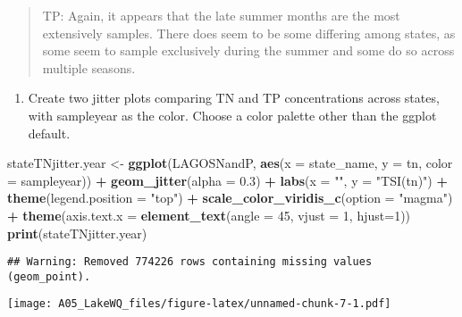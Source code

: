 \documentclass[]{article}
\newenvironment{Shaded}{\begin{snugshade}}{\end{snugshade}}
\newcommand{\DataTypeTok}[1]{\textcolor[rgb]{0.13,0.29,0.53}{#1}}
\newcommand{\DecValTok}[1]{\textcolor[rgb]{0.00,0.00,0.81}{#1}}
\newcommand{\FloatTok}[1]{\textcolor[rgb]{0.00,0.00,0.81}{#1}}
\newcommand{\KeywordTok}[1]{\textcolor[rgb]{0.13,0.29,0.53}{\textbf{#1}}}
\newcommand{\NormalTok}[1]{#1}
\newcommand{\OperatorTok}[1]{\textcolor[rgb]{0.81,0.36,0.00}{\textbf{#1}}}
\newcommand{\StringTok}[1]{\textcolor[rgb]{0.31,0.60,0.02}{#1}}
\providecommand{\tightlist}{%
  \setlength{\itemsep}{0pt}\setlength{\parskip}{0pt}}
\begin{document}
\begin{quote}
TP: Again, it appears that the late summer months are the most
extensively samples. There does seem to be some differing among states,
as some seem to sample exclusively during the summer and some do so
across multiple seasons.
\end{quote}

\begin{enumerate}
\def\labelenumi{\arabic{enumi}.}
\setcounter{enumi}{10}
\tightlist
\item
  Create two jitter plots comparing TN and TP concentrations across
  states, with sampleyear as the color. Choose a color palette other
  than the ggplot default.
\end{enumerate}

\begin{Shaded}
\begin{Highlighting}[]
\NormalTok{stateTNjitter.year <-}\StringTok{ }\KeywordTok{ggplot}\NormalTok{(LAGOSNandP, }\KeywordTok{aes}\NormalTok{(}\DataTypeTok{x =}\NormalTok{ state_name, }\DataTypeTok{y =}\NormalTok{ tn, }\DataTypeTok{color =}\NormalTok{ sampleyear)) }\OperatorTok{+}
\StringTok{  }\KeywordTok{geom_jitter}\NormalTok{(}\DataTypeTok{alpha =} \FloatTok{0.3}\NormalTok{) }\OperatorTok{+}
\StringTok{  }\KeywordTok{labs}\NormalTok{(}\DataTypeTok{x =} \StringTok{""}\NormalTok{, }\DataTypeTok{y =} \StringTok{"TSI(tn)"}\NormalTok{) }\OperatorTok{+}
\StringTok{  }\KeywordTok{theme}\NormalTok{(}\DataTypeTok{legend.position =} \StringTok{"top"}\NormalTok{) }\OperatorTok{+}
\StringTok{  }\KeywordTok{scale_color_viridis_c}\NormalTok{(}\DataTypeTok{option =} \StringTok{"magma"}\NormalTok{) }\OperatorTok{+}
\StringTok{  }\KeywordTok{theme}\NormalTok{(}\DataTypeTok{axis.text.x =} \KeywordTok{element_text}\NormalTok{(}\DataTypeTok{angle =} \DecValTok{45}\NormalTok{, }\DataTypeTok{vjust =} \DecValTok{1}\NormalTok{, }\DataTypeTok{hjust=}\DecValTok{1}\NormalTok{))}
\KeywordTok{print}\NormalTok{(stateTNjitter.year)}
\end{Highlighting}
\end{Shaded}

\begin{verbatim}
## Warning: Removed 774226 rows containing missing values (geom_point).
\end{verbatim}

\texttt{[image: A05\_LakeWQ\_files/figure-latex/unnamed-chunk-7-1.pdf]}
\end{document}
